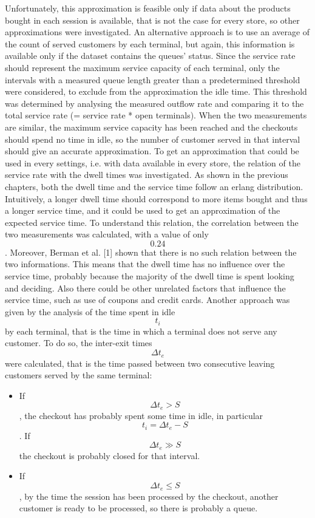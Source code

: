Unfortunately, this approximation is feasible only if data about the products bought in each session is available, that is not the case for every store, so other approximations were investigated.
An alternative approach is to use an average of the count of served customers by each terminal, but again, this information is available only if the dataset contains the queues’ status. Since the service rate should represent the maximum service capacity of each terminal, only the intervals with a measured queue length greater than a predetermined threshold were considered, to exclude from the approximation the idle time. This threshold was determined by analysing the measured outflow rate and comparing it to the total service rate (= service rate * open terminals). When the two measurements are similar, the maximum service capacity has been reached and the checkouts should spend no time in idle, so the number of customer served in that interval should give an accurate approximation.
To get an approximation that could be used in every settings, i.e. with data available in every store, the relation of the service rate with the dwell times was investigated. As shown in the previous chapters, both the dwell time and the service time follow an erlang distribution. Intuitively, a longer dwell time should correspond to more items bought and thus a longer service time, and it could be used to get an approximation of the expected service time. To understand this relation, the correlation between the two measurements was calculated, with a value of only $$ 0.24 $$. Moreover, Berman et al. [1] shown that there is no such relation between the two informations. This means that the dwell time has no influence over the service time, probably because the majority of the dwell time is spent looking and deciding. Also there could be other unrelated factors that influence the service time, such as use of coupons and credit cards.
Another approach was given by the analysis of the time spent in idle $$ t_i $$ by each terminal, that is the time in which a terminal does not serve any customer. To do so, the inter-exit times $$ \Delta t_e $$ were calculated, that is the time passed between two consecutive leaving customers served by the same terminal:
\begin{itemize}
  \item If $$ \Delta t_e > S $$, the checkout has probably spent some time in idle, in particular $$ t_i = \Delta t_e - S $$. If $$ \Delta t_e \gg S $$ the checkout is probably closed for that interval.
  \item If $$ \Delta t_e \le S $$, by the time the session has been processed by the checkout, another customer is ready to be processed, so there is probably a queue.
\end{itemize}

